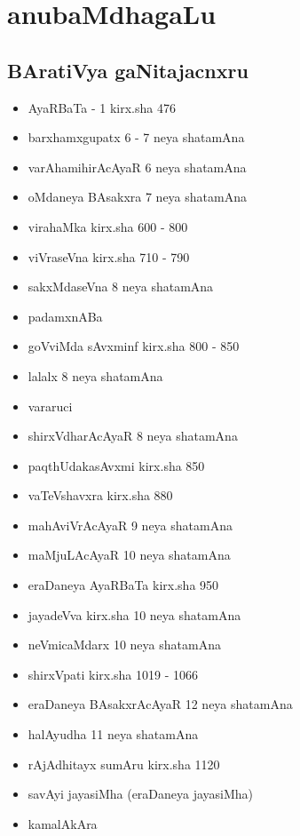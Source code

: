 \chapter{anubaMdhagaLu} 

\section*{BAratiVya gaNitajacnxru}

{\renewcommand\labelitemi{}
\begin{itemize}
\item AyaRBaTa - {\rm 1} kirx.sha {\rm 476}
\item barxhamxgupatx {\rm 6 - 7} neya shatamAna
\item varAhamihirAcAyaR {\rm 6} neya shatamAna
\item oMdaneya BAsakxra {\rm 7} neya shatamAna
\item virahaMka kirx.sha {\rm 600 - 800}
\item viVraseVna kirx.sha {\rm 710 - 790}
\item sakxMdaseVna {\rm 8} neya shatamAna
\item padamxnABa
\item goVviMda sAvxminf kirx.sha {\rm 800 - 850}
\item lalalx {\rm 8} neya shatamAna
\item vararuci
\item shirxVdharAcAyaR {\rm 8} neya shatamAna
\item paqthUdakasAvxmi kirx.sha {\rm 850}
\item vaTeVshavxra kirx.sha {\rm 880}
\item mahAviVrAcAyaR {\rm 9} neya shatamAna
\item maMjuLAcAyaR {\rm 10} neya shatamAna
\item eraDaneya AyaRBaTa kirx.sha {\rm 950}
\item  jayadeVva kirx.sha {\rm 10} neya shatamAna
\item neVmicaMdarx {\rm 10} neya shatamAna
\item shirxVpati kirx.sha {\rm 1019 - 1066}
\item eraDaneya BAsakxrAcAyaR {\rm 12} neya shatamAna
\item halAyudha {\rm 11} neya shatamAna
\item rAjAdhitayx sumAru kirx.sha {\rm 1120}
\item savAyi jayasiMha (eraDaneya jayasiMha)
\item kamalAkAra

\end{itemize}}
